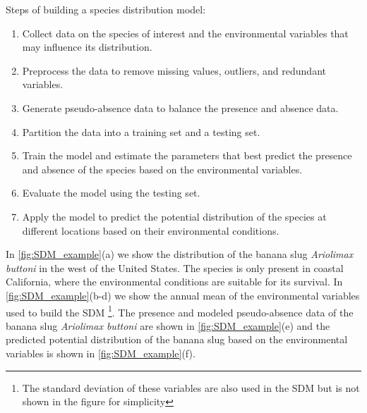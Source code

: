 \begin{theorem}
  Steps of building a species distribution model:
  \begin{enumerate}
    \item Collect data on the species of interest and the environmental
          variables that may influence its distribution.
    \item Preprocess the data to remove missing values, outliers, and
          redundant
          variables.
    \item Generate pseudo-absence data to balance the presence and absence
          data.
    \item Partition the data into a training set and a testing set.
    \item Train the model and estimate the parameters that best predict the
          presence and absence of the species based on the environmental
          variables.
    \item Evaluate the model using the testing set.
    \item Apply the model to predict the potential distribution of the
          species
          at different locations based on their environmental conditions.
  \end{enumerate}
\end{theorem}

In \cref{fig:SDM_example}(a) we show the distribution of the banana slug
\textit{Ariolimax buttoni} in the west of the United States. The species is
only present in coastal California, where the environmental conditions are
suitable for its survival. In \cref{fig:SDM_example}(b-d) we show the annual
mean of the environmental variables used to build the SDM \footnote{The
  standard deviation of these variables are also used in the SDM but is not
  shown in the figure for simplicity}. The presence and modeled pseudo-absence
data of the banana slug \textit{Ariolimax buttoni} are shown in
\cref{fig:SDM_example}(e) and the predicted potential distribution of the
banana slug based on the environmental variables is shown in
\cref{fig:SDM_example}(f).

